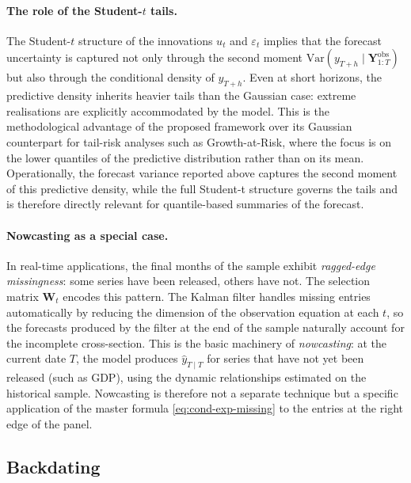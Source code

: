 \documentclass[11pt, a4paper, oneside]{article}
\begin{document}
\paragraph{The role of the Student-$t$ tails.}
The Student-$t$ structure of the innovations $u_t$ and $\varepsilon_t$
implies that the forecast uncertainty is captured not only through the
second moment $\mathrm{Var}(y_{T+h} \mid \mathbf{Y}^{\mathrm{obs}}_{1:T})$
but also through the conditional density of $y_{T+h}$. Even at
short horizons, the predictive density inherits heavier tails than
the Gaussian case: extreme realisations are explicitly accommodated
by the model. This is the methodological advantage of the proposed
framework over its Gaussian counterpart for tail-risk analyses such
as Growth-at-Risk, where the focus is on the lower quantiles of the
predictive distribution rather than on its mean. Operationally, the forecast variance reported above captures the second moment of this predictive density, while the full Student-t
structure governs the tails and is therefore directly relevant for quantile-based summaries of the forecast.

\paragraph{Nowcasting as a special case.}
In real-time applications, the final months of the sample exhibit
\emph{ragged-edge missingness}: some series have been released, others
have not. The selection matrix $\mathbf{W}_t$ encodes this pattern.
The Kalman filter handles missing entries automatically by reducing
the dimension of the observation equation at each $t$, so the
forecasts produced by the filter at the end of the sample naturally
account for the incomplete cross-section. This is the basic machinery
of \emph{nowcasting}: at the current date $T$, the model produces
$\hat{y}_{T \mid T}$ for series that have not yet been released (such
as GDP), using the dynamic relationships estimated on the historical
sample. Nowcasting is therefore not a separate technique but a
specific application of the master formula
\eqref{eq:cond-exp-missing} to the entries at the right edge of the
panel.

\subsection{Backdating}
\end{document}
